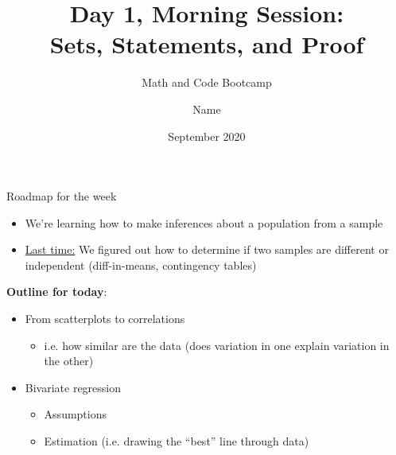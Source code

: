 \documentclass{beamer}
\title{Day 1, Morning Session: \\ {Sets, Statements, and Proof}}
\author{Name}
\institute{\href{}{PhD Student/Post-Doc}, Trinity College Dublin}
\subtitle{Math and Code Bootcamp}
\date{September 2020}
\begin{document}
\frame{\titlepage}


\begin{frame}{Roadmap for the week}
	

	\begin{itemize}
		
		\item
		We're learning how to make inferences about a population from a sample \vspace{.25cm}
		\item \underline{Last time:} We figured out how to determine if two samples are different or independent (diff-in-means, contingency tables)
	\end{itemize}
	
	\vspace{.25cm}
	
	
	\vspace{.25cm}
	\textbf{Outline for today}: \vspace{.25cm}
	\begin{itemize}
		\item From scatterplots to correlations		\vspace{.25cm}
		\begin{itemize}
			\item i.e. how similar are the data (does variation in one explain variation in the other)
		\end{itemize}
		\vspace{.25cm}
		\item Bivariate regression 		\vspace{.25cm}
		\begin{itemize}
			\item Assumptions\vspace{.25cm}
			\item Estimation (i.e. drawing the ``best'' line through data)
		\end{itemize}

	\end{itemize}
	
\end{frame}
\end{document}
